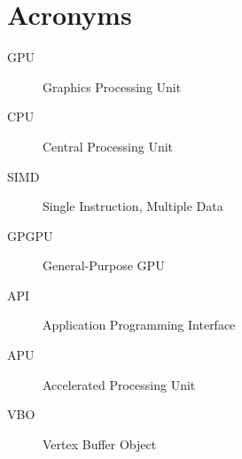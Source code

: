 
\chapter{Acronyms}
\begin{description}
\item[GPU] Graphics Processing Unit
\item[CPU] Central Processing Unit
\item[SIMD] Single Instruction, Multiple Data
\item[GPGPU] General-Purpose GPU
\item[API] Application Programming Interface
\item[APU] Accelerated Processing Unit
\item[VBO] Vertex Buffer Object
\end{description}